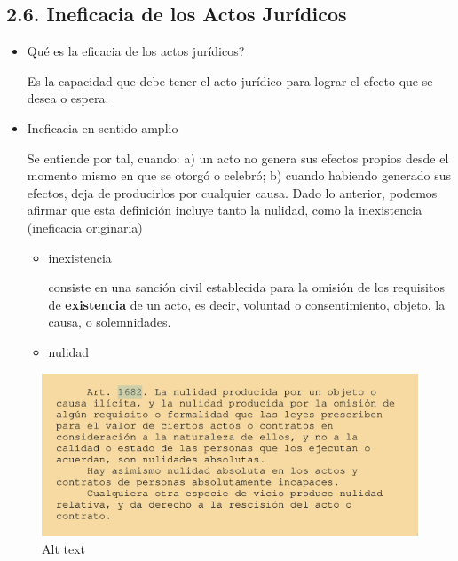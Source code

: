 \documentclass[]{article}
\begin{document}
\hypertarget{ineficacia-de-los-actos-juruxeddicos}{%
\subsection{2.6. Ineficacia de los Actos
Jurídicos}\label{ineficacia-de-los-actos-juruxeddicos}}

\begin{itemize}
\item
  Qué es la eficacia de los actos jurídicos?

  Es la capacidad que debe tener el acto jurídico para lograr el efecto
  que se desea o espera.
\item
  Ineficacia en sentido amplio

  Se entiende por tal, cuando: a) un acto no genera sus efectos propios
  desde el momento mismo en que se otorgó o celebró; b) cuando habiendo
  generado sus efectos, deja de producirlos por cualquier causa. Dado lo
  anterior, podemos afirmar que esta definición incluye tanto la
  nulidad, como la inexistencia (ineficacia originaria)

  \begin{itemize}
  \item
    inexistencia

    consiste en una sanción civil establecida para la omisión de los
    requisitos de \textbf{existencia} de un acto, es decir, voluntad o
    consentimiento, objeto, la causa, o solemnidades.
  \item
    nulidad
  \end{itemize}
\end{itemize}

\begin{figure}
\centering
\includegraphics{1681.png?raw=true}
\caption{Alt text}
\end{figure}
\end{document}
